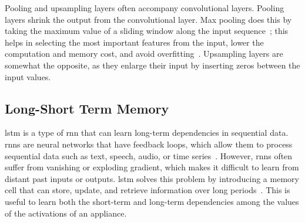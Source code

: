 Pooling and upsampling layers often accompany convolutional layers. Pooling layers shrink the output from the convolutional layer. Max pooling does this by taking the maximum value of a sliding window along the input sequence~\parencite{ahmadDeepLearningMultiscale2019}; this helps in selecting the most important features from the input, lower the computation and memory cost, and avoid overfitting~\parencite{zhangDiveDeepLearning2023,masciStackedConvolutionalAutoEncoders2011}. Upsampling layers are somewhat the opposite, as they enlarge their input by inserting zeros between the input values.

\subsection{Long-Short Term Memory}

\acrfull{lstm} is a type of \acrfull{rnn} that can learn long-term dependencies in sequential data. \acrshort{rnn}s are neural networks that have feedback loops, which allow them to process sequential data such as text, speech, audio, or time series~\parencite{ahmadDeepLearningMultiscale2019}. However, \acrshort{rnn}s often suffer from vanishing or exploding gradient, which makes it difficult to learn from distant past inputs or outputs. \acrshort{lstm} solves this problem by introducing a memory cell that can store, update, and retrieve information over long periods~\parencite{hochreiterLongShortTermMemory1997}. This is useful to learn both the short-term and long-term dependencies among the values of the activations of an appliance.

